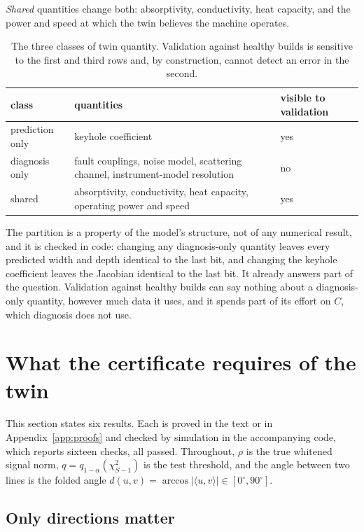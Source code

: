 \documentclass[preprint,12pt]{elsarticle}
\begin{document}
\emph{Shared} quantities change both: absorptivity, conductivity, heat capacity,
and the power and speed at which the twin believes the machine operates.

\begin{table}[t]
\centering
\caption{The three classes of twin quantity. Validation against healthy builds
is sensitive to the first and third rows and, by construction, cannot detect an
error in the second.}
\label{tab:classes}
\small
\begin{tabular}{@{}lp{}l@{}}
\toprule
class & quantities & visible to validation \\
\midrule
prediction only & keyhole coefficient & yes \\
diagnosis only & fault couplings, noise model, scattering channel,
instrument-model resolution & no \\
shared & absorptivity, conductivity, heat capacity, operating power and
speed & yes \\
\bottomrule
\end{tabular}
\end{table}

The partition is a property of the model's structure, not of any numerical
result, and it is checked in code: changing any diagnosis-only quantity leaves
every predicted width and depth identical to the last bit, and changing the
keyhole coefficient leaves the Jacobian identical to the last bit. It already
answers part of the question. Validation against healthy builds can say nothing
about a diagnosis-only quantity, however much data it uses, and it spends part
of its effort on $C$, which diagnosis does not use.

\section{What the certificate requires of the twin}
\label{sec:theory}

This section states six results. Each is proved in the text or in
Appendix~\ref{app:proofs} and checked by simulation in the accompanying code,
which reports sixteen checks, all passed. Throughout, $\rho$ is the true
whitened signal norm, $q = q_{1-\alpha}(\chi^2_{S-1})$ is the test threshold,
and the angle between two lines is the folded angle
$d(u,v) = \arccos|\langle u, v\rangle| \in [0^\circ, 90^\circ]$.

\subsection{Only directions matter}
\end{document}
